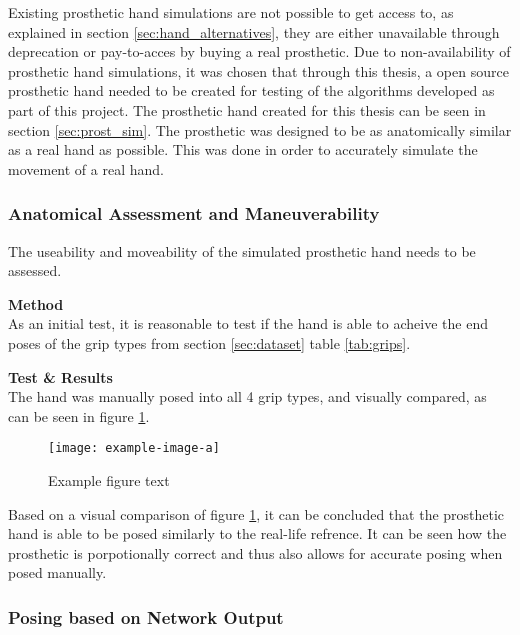 \documentclass[../main.tex]{subfiles}
\begin{document}
Existing prosthetic hand simulations are not possible to get access to, as explained in section \ref{sec:hand_alternatives}, they are either unavailable through deprecation or pay-to-acces by buying a real prosthetic.
Due to non-availability of prosthetic hand simulations, it was chosen that through this thesis, a open source prosthetic hand needed to be created for testing of the algorithms developed as part of this project.
The prosthetic hand created for this thesis can be seen in section \ref{sec:prost_sim}.
The prosthetic was designed to be as anatomically similar as a real hand as possible.
This was done in order to accurately simulate the movement of a real hand.

\subsubsection{Anatomical Assessment and Maneuverability}

The useability and moveability of the simulated prosthetic hand needs to be assessed.

\textbf{Method}\\
As an initial test, it is reasonable to test if the hand is able to acheive the end poses of the grip types from section \ref{sec:dataset} table \ref{tab:grips}. 

\textbf{Test \& Results}\\

The hand was manually posed into all 4 grip types, and visually compared, as can be seen in figure  \ref{fig:hand_pose_test}.

\begin{figure}[h]
\begin{center}
\texttt{[image: example-image-a]}
\caption{Example figure text}
\label{fig:hand_pose_test}
\end{center}
\end{figure}

Based on a visual comparison of figure \ref{fig:hand_pose_test}, it can be concluded that the prosthetic hand is able to be posed similarly to the real-life refrence.
It can be seen how the prosthetic is porpotionally correct and thus also allows for accurate posing when posed manually.

\subsubsection{Posing based on Network Output}
\end{document}
